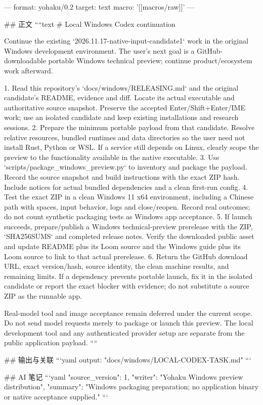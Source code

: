---
format: yohaku/0.2
target: text
macro: '[[macros/raw]]'
---

## 正文
````text
# Local Windows Codex continuation

Continue the existing `2026.11.17-native-input-candidate1` work in the original
Windows development environment. The user's next goal is a GitHub-downloadable
portable Windows technical preview; continue product/ecosystem work afterward.

1. Read this repository's `docs/windows/RELEASING.md` and the original candidate's
   README, evidence and diff. Locate its actual executable and authoritative
   source snapshot. Preserve the accepted Enter/Shift+Enter/IME work; use an
   isolated candidate and keep existing installations and research sessions.
2. Prepare the minimum portable payload from that candidate. Resolve relative
   resources, bundled runtimes and data directories so the user need not install
   Rust, Python or WSL. If a service still depends on Linux, clearly scope the
   preview to the functionality available in the native executable.
3. Use `scripts/package_windows_preview.py` to inventory and package the payload.
   Record the source snapshot and build instructions with the exact ZIP hash.
   Include notices for actual bundled dependencies and a clean first-run config.
4. Test the exact ZIP in a clean Windows 11 x64 environment, including a Chinese
   path with spaces, input behavior, logs and close/reopen. Record real outcomes;
   do not count synthetic packaging tests as Windows app acceptance.
5. If launch succeeds, prepare/publish a Windows technical-preview prerelease
   with the ZIP, `SHA256SUMS` and completed release notes. Verify the downloaded
   public asset and update README plus its Loom source and the Windows guide
   plus its Loom source to link to that actual prerelease.
6. Return the GitHub download URL, exact version/hash, source identity, the clean
   machine results, and remaining limits. If a dependency prevents portable
   launch, fix it in the isolated candidate or report the exact blocker with
   evidence; do not substitute a source ZIP as the runnable app.

Real-model tool and image acceptance remain deferred under the current scope.
Do not send model requests merely to package or launch this preview. The local
development tool and any authenticated provider setup are separate from the
public application payload.
````

## 输出与关联
```yaml
output: "docs/windows/LOCAL-CODEX-TASK.md"
```

## AI 笔记
```yaml
{"source_version": 1, "writer": "Yohaku Windows preview distribution", "summary": "Windows packaging preparation; no application binary or native acceptance supplied."}
```
